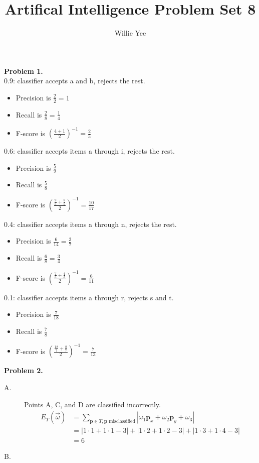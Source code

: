\documentclass{article}
\begin{document}
\title{Artifical Intelligence Problem Set 8}
\date{}
\author{Willie Yee}
\maketitle
\noindent
\textbf{Problem 1.}\\
0.9: classifier accepts a and b, rejects the rest.
\begin{itemize}
	\item Precision is $\frac{2}{2}=1$
	\item Recall is $\frac{2}{8}=\frac{1}{4}$
	\item F-score is $(\frac{4 + 1}{2})^{-1}=\frac{2}{5}$
\end{itemize}
0.6: classifier accepts items a through i, rejects the rest.
\begin{itemize}
	\item Precision is $\frac{5}{9}$
	\item Recall is $\frac{5}{8}$
	\item F-score is $(\frac{\frac{9}{5}+\frac{8}{5}}{2})^{-1}=\frac{10}{17}$
\end{itemize}
0.4: classifier accepts items a through n, rejects the rest.
\begin{itemize}
	\item Precision is $\frac{6}{14}=\frac{3}{7}$
	\item Recall is $\frac{6}{8}=\frac{3}{4}$
	\item F-score is $(\frac{\frac{7}{3}+\frac{4}{3}}{2})^{-1}=\frac{6}{11}$
\end{itemize}
0.1: classifier accepts items a through r, rejects s and t.
\begin{itemize}
	\item Precision is $\frac{7}{18}$
	\item Recall is $\frac{7}{8}$
	\item F-score is $(\frac{\frac{18}{7}+\frac{8}{7}}{2})^{-1}=\frac{7}{13}$
\end{itemize}
\textbf{Problem 2.}
\begin{description}
	\item [A.] Points A, C, and D are classified incorrectly.
	\begin{align*}
		E_T(\vec{\omega})&=\sum_{\textbf{p}\in T,\textbf{p}\text{ misclassified}}|\omega_1\textbf{p}_x+\omega_2\textbf{p}_y+\omega_3|\\
		&=|1\cdot 1+1\cdot 1-3|+|1\cdot 2+1\cdot 2-3|+|1\cdot 3+1\cdot 4-3|\\
		&=6
	\end{align*}
	\item [B.]
\end{description}
\end{document}
